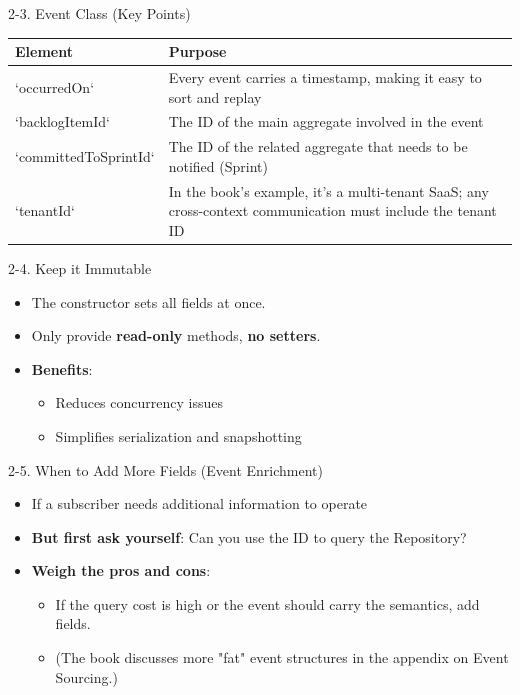 \documentclass{beamer}
\begin{document}
\begin{frame}{2-3. Event Class (Key Points)}
  \begin{tabular}{|l|p{7cm}|}
    \hline
    \textbf{Element} & \textbf{Purpose} \\
    \hline
    `occurredOn` & Every event carries a timestamp, making it easy to sort and replay \\
    \hline
    `backlogItemId` & The ID of the main aggregate involved in the event \\
    \hline
    `committedToSprintId` & The ID of the related aggregate that needs to be notified (Sprint) \\
    \hline
    `tenantId` & In the book's example, it's a multi-tenant SaaS; any cross-context communication must include the tenant ID \\
    \hline
  \end{tabular}
\end{frame}

\begin{frame}{2-4. Keep it Immutable}
  \begin{itemize}
    \item The constructor sets all fields at once.
    \item Only provide \textbf{read-only} methods, \textbf{no setters}.
    \item<2-> \textbf{Benefits}:
      \begin{itemize}
        \item Reduces concurrency issues
        \item Simplifies serialization and snapshotting
      \end{itemize}
  \end{itemize}
\end{frame}

\begin{frame}{2-5. When to Add More Fields (Event Enrichment)}
  \begin{itemize}
    \item<1-> If a subscriber needs additional information to operate
    \item<2-> \textbf{But first ask yourself}: Can you use the ID to query the Repository?
    \item<3-> \textbf{Weigh the pros and cons}:
      \begin{itemize}
        \item If the query cost is high or the event should carry the semantics, add fields.
        \item (The book discusses more "fat" event structures in the appendix on Event Sourcing.)
      \end{itemize}
  \end{itemize}
\end{frame}
\end{document}
